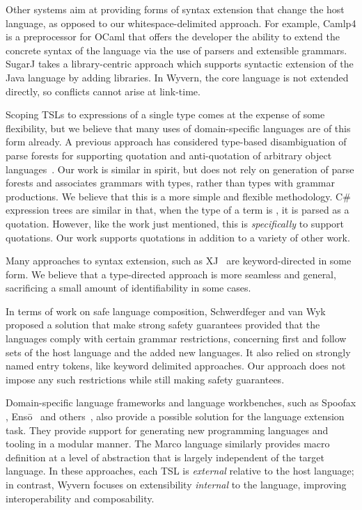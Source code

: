Other systems aim at providing forms of syntax extension that change the host language, as opposed to our whitespace-delimited approach.  For example, Camlp4 \cite{camlp4} is a preprocessor for OCaml that offers the developer the ability to extend the concrete syntax of the language via the use of parsers and extensible grammars.  SugarJ \cite{Erdweg:2011:SLL:2048147.2048199} takes a library-centric approach which supports syntactic extension of the Java language by adding libraries. In Wyvern, the core language
is not extended directly, so conflicts cannot arise at link-time. 

Scoping TSLs to expressions of a single type comes at the expense of some flexibility, but we believe that many uses of domain-specific languages are of this form already. A previous approach has considered type-based disambiguation of parse forests for supporting quotation and anti-quotation of arbitrary object languages~\cite{bravenboer2005generalized}. Our work is similar in spirit, but does not rely on generation of parse forests and associates grammars with types, rather than types with grammar productions. We believe that this is a more simple and flexible methodology. 
 C\# expression trees \cite{Csharp} are similar in that, when the type of a term is , it is parsed as a quotation. However, like the work just mentioned, this is \emph{specifically} to support quotations. Our work supports quotations in addition to a variety of other work.
 
Many approaches to syntax extension, such as XJ~\cite{DBLP:conf/scam/ClarkSW08} are keyword-directed in some form. We believe that a type-directed approach is more seamless and general, sacrificing a small amount of identifiability in some cases. 

In terms of work on safe language composition, Schwerdfeger and van Wyk~\cite{Schwerdfeger:2009:VCD:1542476.1542499} proposed a solution that make strong safety guarantees provided that the languages comply with certain grammar restrictions, concerning first and follow sets of the host language and the added new languages. It also relied on strongly named entry tokens, like keyword delimited approaches. Our approach does not impose any such restrictions while still making safety guarantees.

Domain-specific language frameworks and language workbenches, such as Spoofax \cite{KatsVisser2010}, Ens\={o}~\cite{enso} and others~\cite{krahn2008monticore,van1992pregmatic}, also provide a possible solution for the language extension task. They provide support for generating new programming languages and tooling in a modular manner.  The Marco language \cite{lee:2012:marco} similarly provides macro definition at a level of abstraction that is largely independent of the target language. In these approaches, each TSL is \emph{external} relative to the host language; in contrast, Wyvern focuses on extensibility \emph{internal} to the language, improving interoperability and composability.

